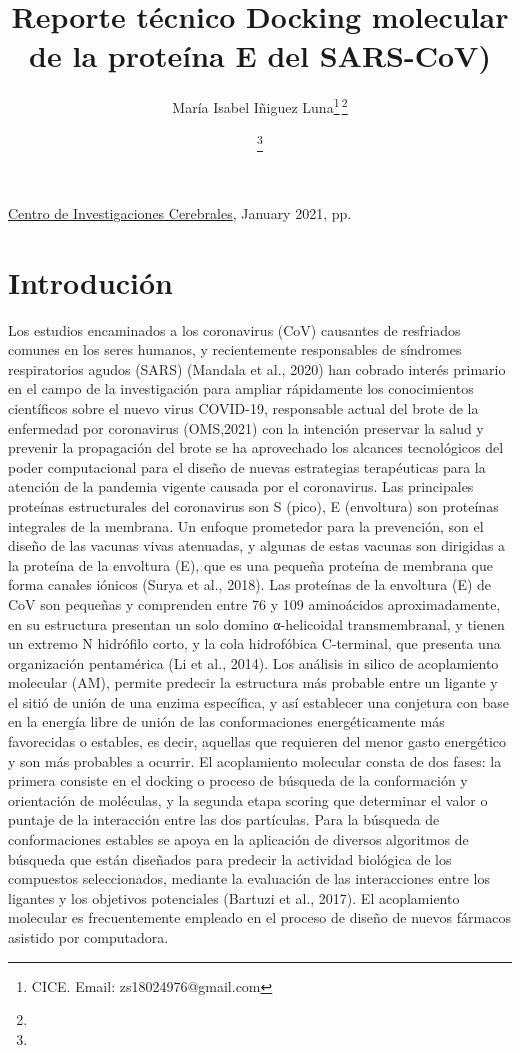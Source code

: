 \documentclass[12pt]{article}
\title{Reporte técnico Docking molecular de la proteína E del SARS-CoV)}
\author{
María Isabel Iñiguez Luna\thanks{CICE. Email: zs18024976@gmail.com}\;\,\thanks{}
\and 
  \thanks{} 
\and
  \footnotemark[2] %
}
\date{} %
\newcommand{\jref}{}
\newcommand{\jhead}{Centro de Investigaciones Cerebrales}
\newcommand{\jdate}{January 2021}
\begin{document}

\begin{htmlonly}
\href{\jref}{\jhead}, \jdate, pp.\
\end{htmlonly}

\maketitle
\thispagestyle{firstpage}


\section{Introdución}

Los estudios encaminados a los coronavirus (CoV) causantes de resfriados comunes en los seres humanos, y recientemente responsables de síndromes respiratorios agudos (SARS) (Mandala et al., 2020) han cobrado interés primario en el campo de la investigación para ampliar rápidamente los conocimientos científicos sobre el nuevo virus COVID-19, responsable actual del brote de la enfermedad por coronavirus (OMS,2021) con la intención preservar la salud y prevenir la propagación del brote se ha aprovechado los alcances tecnológicos del poder computacional para el diseño de nuevas estrategias terapéuticas para la atención de la pandemia vigente causada por el coronavirus. Las principales proteínas estructurales del coronavirus son S (pico), E (envoltura) son proteínas integrales de la membrana.
Un enfoque prometedor para la prevención, son el diseño de las vacunas vivas atenuadas, y algunas de estas vacunas son dirigidas a la proteína de la envoltura (E), que es una pequeña proteína de membrana que forma canales iónicos (Surya et al., 2018). Las proteínas de la envoltura (E) de CoV son pequeñas y comprenden entre 76 y 109 aminoácidos aproximadamente, en su estructura presentan un solo domino α-helicoidal transmembranal, y tienen un extremo N hidrófilo corto, y la cola hidrofóbica C-terminal, que presenta una organización pentamérica (Li et al., 2014).
Los análisis in silico de acoplamiento molecular (AM), permite predecir la estructura más probable entre un ligante y el sitió de unión de una enzima específica, y así establecer una conjetura con base en la energía libre de unión de las conformaciones energéticamente más favorecidas o estables, es decir, aquellas que requieren del menor gasto energético y son más probables a ocurrir. El acoplamiento molecular consta de dos fases: la primera consiste en el docking o proceso de búsqueda de la conformación y orientación de moléculas, y la segunda etapa scoring que determinar el valor o puntaje de la interacción entre las dos partículas. Para la búsqueda de conformaciones estables se apoya en la aplicación de diversos algoritmos de búsqueda que están diseñados para predecir la actividad biológica de los compuestos seleccionados, mediante la evaluación de las interacciones entre los ligantes y los objetivos potenciales (Bartuzi et al., 2017). El acoplamiento molecular es frecuentemente empleado en el proceso de diseño de nuevos fármacos asistido por computadora.
\end{document}
